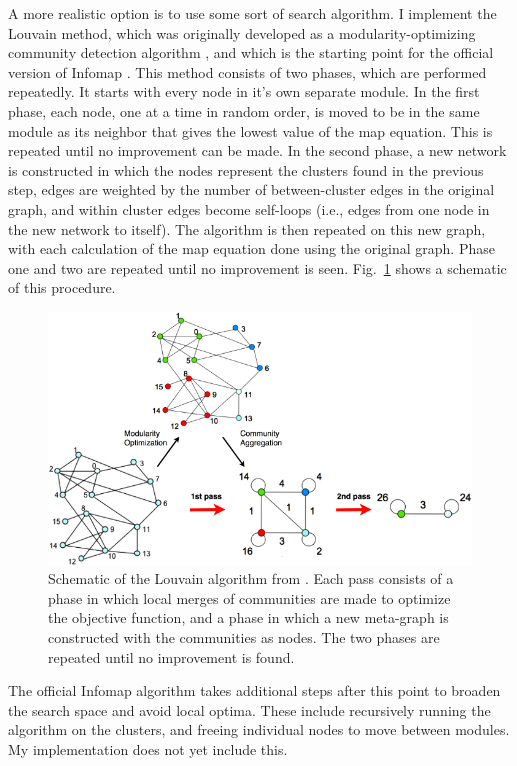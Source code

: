 A more realistic option is to use some sort of search algorithm. I
implement the Louvain method, which was originally developed as a
modularity-optimizing community detection algorithm
\autocite{blondel_fast_2008}, and which is the starting point for the
official version of Infomap \autocite{rosvall_map_2010}. This method
consists of two phases, which are performed repeatedly. It starts with
every node in it's own separate module. In the first phase, each node,
one at a time in random order, is moved to be in the same module as its
neighbor that gives the lowest value of the map equation. This is
repeated until no improvement can be made. In the second phase, a new
network is constructed in which the nodes represent the clusters found
in the previous step, edges are weighted by the number of
between-cluster edges in the original graph, and within cluster edges
become self-loops (i.e., edges from one node in the new network to
itself). The algorithm is then repeated on this new graph, with each
calculation of the map equation done using the original graph. Phase one
and two are repeated until no improvement is seen.
Fig.~\ref{fig:louvain} shows a schematic of this procedure.

\begin{figure}
\centering
\includegraphics{img/blondel2008_fig1_louvain.jpg}
\caption{Schematic of the Louvain algorithm from
\autocite{blondel_fast_2008}. Each pass consists of a phase in which
local merges of communities are made to optimize the objective function,
and a phase in which a new meta-graph is constructed with the
communities as nodes. The two phases are repeated until no improvement
is found.}\label{fig:louvain}
\end{figure}

The official Infomap algorithm takes additional steps after this point
to broaden the search space and avoid local optima. These include
recursively running the algorithm on the clusters, and freeing
individual nodes to move between modules. My implementation does not yet
include this.

